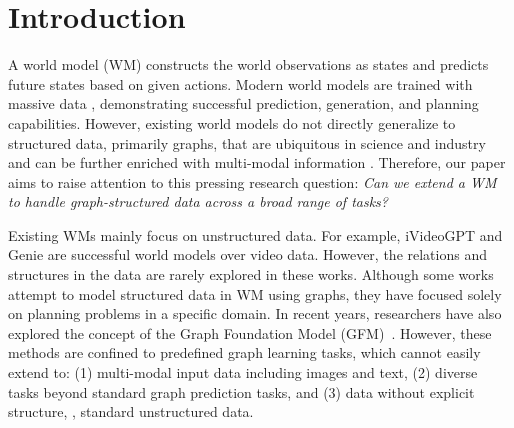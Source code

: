 \section{Introduction}
\label{sec:intro}

A world model (WM) \citep{ha2018recurrent} constructs the world observations as states and predicts future states based on given actions. Modern world models are trained with massive data \citep{liu2024world,cui2023universal}, demonstrating successful prediction, generation, and planning capabilities. However, existing world models do not directly generalize to structured data, primarily graphs, that are ubiquitous in science \cite{jin2018junction,you2018graph} and industry \cite{ying2018graph,you2022roland} and can be further enriched with multi-modal information \cite{ektefaie2023multimodal}.
Therefore, our paper aims to raise attention to this pressing research question: 
\textit{Can we extend a WM to handle graph-structured data across a broad range of tasks?}

Existing WMs mainly focus on unstructured data. For example, iVideoGPT \citep{wu2024ivideogpt} and Genie \citep{bruce2024genie} are successful world models over video data. However, the relations and structures in the data are rarely explored in these works. Although some works \citep{zhang2021world,zhu2022value} attempt to model structured data in WM using graphs, they have focused solely on planning problems in a specific domain.
In recent years, researchers have also explored the concept of the Graph Foundation Model (GFM)~\citep{liu2023one,chen2024llaga}. However, these methods are confined to predefined graph learning tasks, which cannot easily extend to: (1) multi-modal input data including images and text, (2) diverse tasks beyond standard graph prediction tasks, and (3) data without explicit structure, \ie, standard unstructured data.

